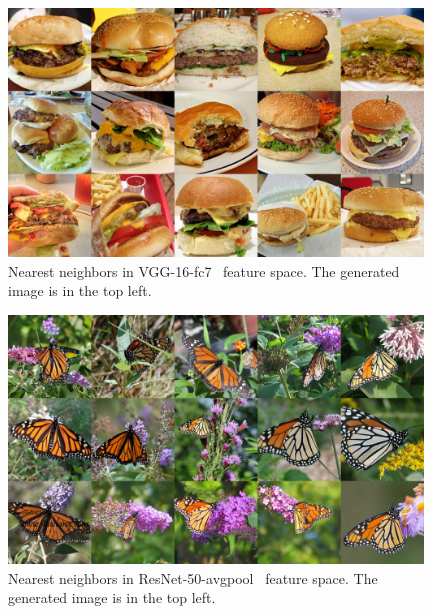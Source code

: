 \begin{figure}[htbp]
\centering
\includegraphics[width=0.98\textwidth]{images/neighbors/burger_vgg_fc7.jpg} 
\caption{Nearest neighbors in VGG-16-fc7~\citep{simonyan15very} feature space. The generated image is in the top left.}
\label{appendix_nearest_burgerVGG}
\end{figure}

\begin{figure}[htbp]
\centering
\includegraphics[width=0.98\textwidth]{images/neighbors/butterfly_resnet_flat.jpg} 
\caption{Nearest neighbors in ResNet-50-avgpool~\citep{he2016resnets} feature space. The generated image is in the top left.}
\label{appendix_nearest_MonarchResNet}
\end{figure}


\clearpage